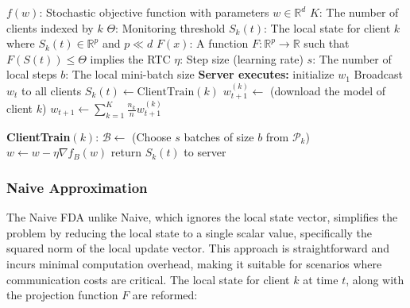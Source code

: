 \begin{algorithm}[H]
    \caption{FDA: FL training with Approximate RTC Monitoring}
    \begin{algorithmic}
        \Require $f(w)$: Stochastic objective function with parameters $w \in \mathbb{R}^d$
        \Require $K$: The number of clients indexed by $k$
        \Require $\Theta$: Monitoring threshold
        \Require $S_k(t)$: The local state for client $k$ where $S_k(t) \in \mathbb{R}^p$ and $p \ll d$
        \Require $F(x)$: A function $F : \mathbb{R}^p \to \mathbb{R}$ such that $F(S(t)) \leq \Theta$ implies the RTC
        \Require $\eta$: Step size (learning rate)
        \Require $s$: The number of local steps
        \Require $b$: The local mini-batch size
        \State \textbf{Server executes:}
        \Indent
        \State initialize $w_1$
        \State Broadcast $w_t$ to all clients
        \Repeat
        \State $S_k(t) \leftarrow \text{ClientTrain}(k)$
        \EndFor
        \State $w_{t+1}^{(k)} \leftarrow$ (download the model of client $k$)
        \EndFor
        \State $w_{t+1} \leftarrow \sum_{k=1}^{K} \frac{n_k}{n} w_{t+1}^{(k)}$
        \EndFor
        \EndIndent

        \State \textbf{ClientTrain}$(k)$:
        \Indent
        \State $\mathcal{B} \leftarrow$ (Choose $s$ batches of size $b$ from $\mathcal{P}_k$)
        \State $w \leftarrow w - \eta \nabla f_B(w)$
        \EndFor
        \State return $S_k(t)$ to server
        \EndIndent
    \end{algorithmic}
\end{algorithm}

\subsubsection{Naive Approximation}
The Naive FDA unlike Naive, which ignores the local state vector, simplifies the problem by reducing the local state to a single scalar value,
specifically the squared norm of the local update vector. This approach is straightforward and incurs minimal computation overhead, making it
suitable for scenarios where communication costs are critical. The local state for client $k$ at time $t$, along with the projection function
$F$ are reformed:


